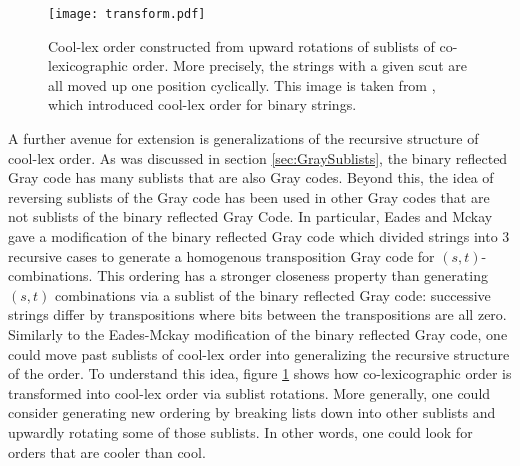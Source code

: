 \begin{figure}
\begin{center}
        \texttt{[image: transform.pdf]}
\end{center}
        \cprotect\caption[Cool-lex order constructed from upward rotations of sublists of co-lexicographic order.]{Cool-lex order constructed from upward rotations of sublists of co-lexicographic order.  More precisely, the strings with a given scut are all moved up one position cyclically.  This image is taken from \cite{ruskey2005generating,ruskey2009coolest}, which introduced cool-lex order for binary strings. }
\label{fig:cooltransform}
\end{figure}

A further avenue for extension is generalizations of the recursive structure of cool-lex order.  As was discussed in section \ref{sec:GraySublists}, the binary reflected Gray code has many sublists that are also Gray codes.  Beyond this, the idea of reversing sublists of the Gray code has been used in other Gray codes that are not sublists of the binary reflected Gray Code.  In particular, Eades and Mckay gave a modification of the binary reflected Gray code which divided strings into 3 recursive cases to generate a homogenous transposition Gray code for $(s,t)$-combinations. This ordering has a stronger closeness property than generating $(s,t)$ combinations via a sublist of the binary reflected Gray code: successive strings differ by transpositions where bits between the transpositions are all zero.  Similarly to the Eades-Mckay modification of the binary reflected Gray code, one could move past sublists of cool-lex order into generalizing the recursive structure of the order.  To understand this idea, figure \ref{fig:cooltransform} shows how co-lexicographic order is transformed into cool-lex order via sublist rotations.  More generally, one could consider generating new ordering by breaking lists down into other sublists and upwardly rotating some of those sublists. In other words, one could look for orders that are cooler than cool. 
